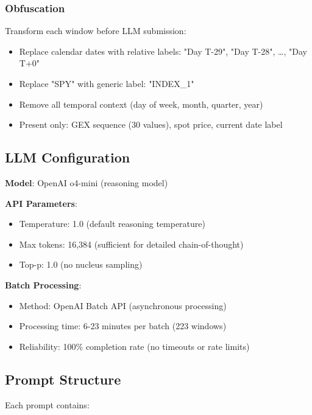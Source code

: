 \subsubsection{Obfuscation}

Transform each window before LLM submission:
\begin{itemize}
\item Replace calendar dates with relative labels: "Day T-29", "Day T-28", \ldots, "Day T+0"
\item Replace "SPY" with generic label: "INDEX\_1"
\item Remove all temporal context (day of week, month, quarter, year)
\item Present only: GEX sequence (30 values), spot price, current date label
\end{itemize}

\subsection{LLM Configuration}

\textbf{Model}: OpenAI o4-mini (reasoning model)

\textbf{API Parameters}:
\begin{itemize}
\item Temperature: 1.0 (default reasoning temperature)
\item Max tokens: 16,384 (sufficient for detailed chain-of-thought)
\item Top-p: 1.0 (no nucleus sampling)
\end{itemize}

\textbf{Batch Processing}:
\begin{itemize}
\item Method: OpenAI Batch API (asynchronous processing)
\item Processing time: 6-23 minutes per batch (223 windows)
\item Reliability: 100\% completion rate (no timeouts or rate limits)
\end{itemize}

\subsection{Prompt Structure}

Each prompt contains:

\vspace{0.2cm}

